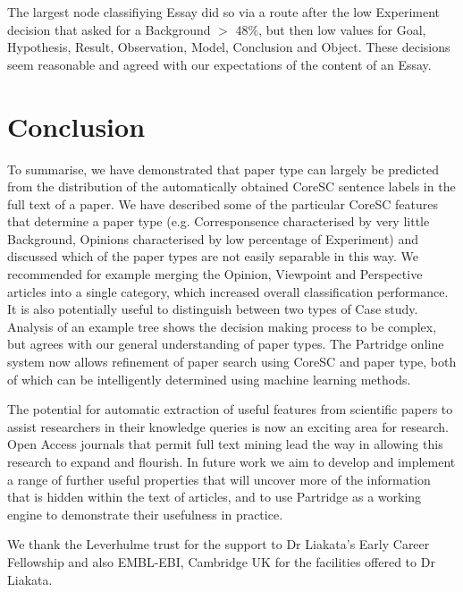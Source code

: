 \documentclass{svmult}
\begin{document}
The largest node classifiying Essay did so via a route after the low
Experiment decision that asked for a Background $>$ 48\%, but then low
values for Goal, Hypothesis, Result, Observation, Model, Conclusion
and Object. These decisions seem reasonable and agreed with our
expectations of the content of an Essay.

\section{Conclusion}
\label{sec:4}

To summarise, we have demonstrated that paper type can largely be
predicted from the distribution of the automatically obtained CoreSC
sentence labels in the full text of a paper. We have described some of
the particular CoreSC features that determine a paper type
(e.g. Corresponsence characterised by very little Background, Opinions
characterised by low percentage of Experiment) and discussed which of
the paper types are not easily separable in this way. We recommended
for example merging the Opinion, Viewpoint and Perspective articles
into a single category, which increased overall
classification performance. It is also potentially useful to distinguish between two types of Case study.
Analysis of an example tree shows the decision making
process to be complex, but agrees with our general understanding of
paper types. The Partridge online system now allows refinement of
paper search using CoreSC and paper type, both of which can be
intelligently determined using machine learning methods.



The potential for automatic extraction of useful features from
scientific papers to assist researchers in their knowledge queries is
now an exciting area for research. Open Access journals that permit
full text mining lead the way in allowing this research to expand and
flourish. In future work we aim to develop and implement a range of
further useful properties that will uncover more of the information
that is hidden within the text of articles, and to use Partridge as a
working engine to demonstrate their usefulness in practice.


\begin{acknowledgement}
We thank the Leverhulme trust for the support to Dr Liakata's Early Career Fellowship and also EMBL-EBI, Cambridge UK for the facilities offered to Dr Liakata.
\end{acknowledgement}





%
\end{document}
